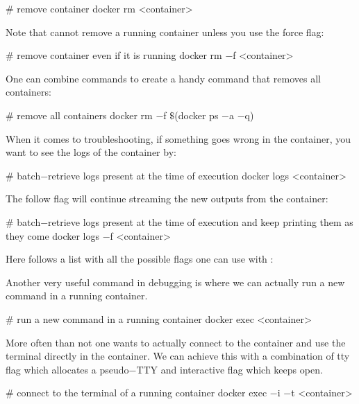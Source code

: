 \begin{bash}
# remove container
docker rm <container>
\end{bash}

Note that  cannot remove a running container unless you use the force  flag:

\begin{bash}
# remove container even if it is running
docker rm $-$f <container>
\end{bash}

One can combine commands to create a handy command that removes all containers:

\begin{bash}
# remove all containers
docker rm $-$f $\$$(docker ps $-$a $-$q)
\end{bash}

When it comes to troubleshooting, if something goes wrong in the container, you want to see the logs of the container
by:

\begin{bash}
# batch$-$retrieve logs present at the time of execution
docker logs <container>
\end{bash}

The follow  flag will continue streaming the new outputs from the container:

\begin{bash}
# batch$-$retrieve logs present at the time of execution and keep printing them as they come
docker logs $-$f <container>
\end{bash}

Here follows a list with all the possible flags one can use with :


Another very useful command in debugging is  where we can actually run a new command in a running
container.

\begin{bash}
# run a new command in a running container
docker exec <container>
\end{bash}

More often than not one wants to actually connect to the container and use the terminal directly in the container. We
can achieve this with a combination of tty  flag which allocates a pseudo$-$TTY and interactive
 flag which keeps  open.

\begin{bash}
# connect to the terminal of a running container
docker exec $-$i $-$t <container>
\end{bash}

